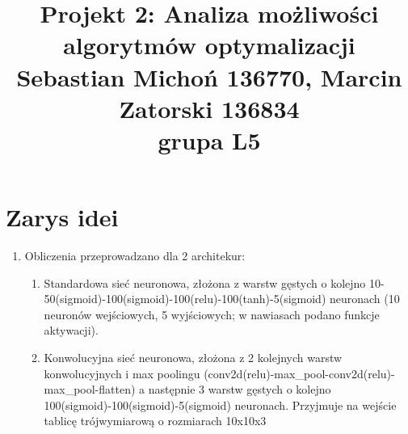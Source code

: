 \documentclass[12pt]{article}
\begin{document}
\title{Projekt 2: Analiza możliwości algorytmów optymalizacji\\
\large Sebastian Michoń 136770, Marcin Zatorski 136834\\
\large grupa L5}
\date{\vspace{-10ex}}
\maketitle

\section{Zarys idei}
\begin{enumerate}
	\item Obliczenia przeprowadzano dla 2 architekur:
	\begin{enumerate}
		\item Standardowa sieć neuronowa, złożona z warstw gęstych o kolejno 10-50(sigmoid)-100(sigmoid)-100(relu)-100(tanh)-5(sigmoid) neuronach (10 neuronów wejściowych, 5 wyjściowych; w nawiasach podano funkcje aktywacji).
		\item Konwolucyjna sieć neuronowa, złożona z 2 kolejnych warstw konwolucyjnych i max poolingu (conv2d(relu)-max\_pool-conv2d(relu)-max\_pool-flatten) a następnie 3 warstw gęstych o kolejno 100(sigmoid)-100(sigmoid)-5(sigmoid) neuronach. Przyjmuje na wejście tablicę trójwymiarową o rozmiarach 10x10x3
	\end{enumerate}


\end{enumerate}
\end{document}
